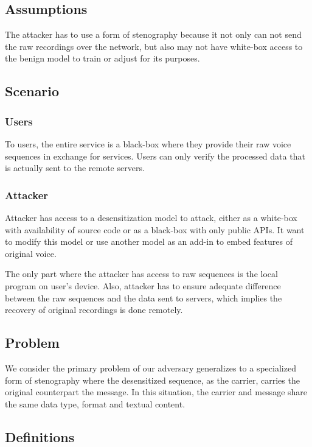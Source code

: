 \documentclass[conference]{IEEEtran}
\begin{document}
\subsection{Assumptions}

The attacker has to use a form of stenography because it not only can not send the raw recordings over the network, but also may not have white-box access to the benign model to train or adjust for its purposes.

\subsection{Scenario}

\subsubsection{Users}

To users, the entire service is a black-box where they provide their raw voice sequences in exchange for services. Users can only verify the processed data that is actually sent to the remote servers.

\subsubsection{Attacker}

Attacker has access to a desensitization model to attack, either as a white-box with availability of source code or as a black-box with only public APIs. It want to modify this model or use another model as an add-in to embed features of original voice.

The only part where the attacker has access to raw sequences is the local program on user's device. Also, attacker has to ensure adequate difference between the raw sequences and the data sent to servers, which implies the recovery of original recordings is done remotely.

\subsection{Problem}

We consider the primary problem of our adversary generalizes to a specialized form of stenography where the desensitized sequence, as the carrier, carries the original counterpart the message. In this situation, the carrier and message share the same data type, format and textual content.

\subsection{Definitions}
\end{document}

